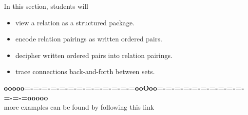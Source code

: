 \documentclass{ximera}
\begin{document}
\begin{sectionOutcomes}
In this section, students will 

\begin{itemize}
\item view a relation as a structured package.
\item encode relation pairings as written ordered pairs.
\item decipher written ordered pairs into relation pairings.
\item trace connections back-and-forth between sets.
\end{itemize}
\end{sectionOutcomes}







\begin{center}
\textbf{\textcolor{green!50!black}{ooooo=-=-=-=-=-=-=-=-=-=-=-=-=ooOoo=-=-=-=-=-=-=-=-=-=-=-=-=ooooo}} \\

more examples can be found by following this link\\ 

\end{center}
\end{document}
